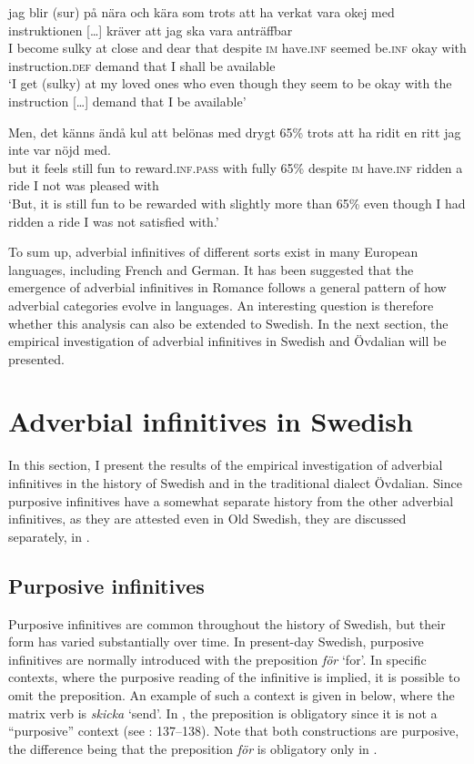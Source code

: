 \documentclass[output=paper]{langscibook}
\begin{document}
\ea
\label{ex:kalm:7}
\ea  \label{ex:kalm:7a}
\gll jag blir (sur) på nära och kära som trots att ha verkat vara okej med {instruktionen […]} kräver att jag ska vara anträffbar\\
I become sulky at close and dear that despite \textsc{im} have.\textsc{inf} seemed be.\textsc{inf} okay with instruction.\textsc{def} demand that I shall be available\\ 
\glt ‘I get (sulky) at my loved ones who even though they seem to be okay with the instruction […] demand that I be available’ \citep{Blogg2007}

\ex  \label{ex:kalm:7b}
\gll Men, det känns ändå kul att belönas med drygt 65\% trots att ha ridit en ritt jag inte var nöjd med.\\
but it feels still fun to reward.\textsc{inf.pass} with fully 65\% despite \textsc{im} have.\textsc{inf} ridden a ride I not was pleased with\\ 
\glt ‘But, it is still fun to be rewarded with slightly more than 65\% even though I had ridden a ride I was not satisfied with.’ \citep{Blogg2016}
\z 
\z 



To sum up, adverbial infinitives of different sorts exist in many European languages, including French and German. It has been suggested that the emergence of adverbial infinitives in Romance follows a general pattern of how adverbial categories evolve in languages. An interesting question is therefore whether this analysis can also be extended to Swedish. In the next section, the empirical investigation of adverbial infinitives in Swedish and Övdalian will be presented. 


\section{Adverbial infinitives in Swedish}\label{sec:kalm:4}
In this section, I present the results of the empirical investigation of adverbial infinitives in the history of Swedish and in the traditional dialect Övdalian. Since purposive infinitives have a somewhat separate history from the other adverbial infinitives, as they are attested even in Old Swedish, they are discussed separately, in .


\subsection{Purposive infinitives}\label{sec:kalm:4.1}
Purposive infinitives are common throughout the history of Swedish, but their form has varied substantially over time. In present-day Swedish, purposive infinitives are normally introduced with the preposition \textit{för} ‘for’. In specific contexts, where the purposive reading of the infinitive is implied, it is possible to omit the preposition. An example of such a context is given in  below, where the matrix verb is \textit{skicka} ‘send’. In , the preposition is obligatory since it is not a “purposive” context (see \citealt{Kalm2016Satsekvivalenta}: 137–138). Note that both constructions are purposive, the difference being that the preposition \textit{för} is obligatory only in . 
\end{document}

